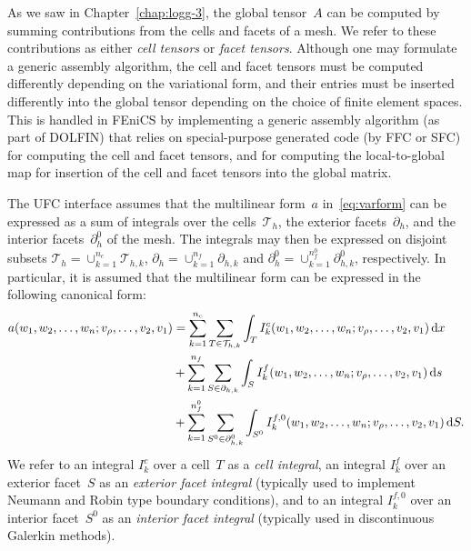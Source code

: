As we saw in Chapter~\ref{chap:logg-3}, the global tensor~$A$ can be
computed by summing contributions from the cells and facets of a
mesh. We refer to these contributions as either \emph{cell tensors} or
\emph{facet tensors}. Although one may formulate a generic assembly
algorithm, the cell and facet tensors must be computed differently
depending on the variational form, and their entries must be inserted
differently into the global tensor depending on the choice of finite
element spaces. This is handled in FEniCS by implementing a generic
assembly algorithm (as part of DOLFIN) that relies on special-purpose
generated code (by FFC or SFC) for computing the cell and facet
tensors, and for computing the local-to-global map for insertion of
the cell and facet tensors into the global matrix.

The UFC interface assumes that the multilinear form~$a$
in~\eqref{eq:varform} can be expressed as a sum of integrals over the
cells~$\mathcal{T}_h$, the exterior facets~$\partial_h$, and the
interior facets~$\partial_h^0$ of the mesh. The integrals may then be
expressed on disjoint subsets $\mathcal{T}_h = \cup_{k=1}^{n_c}
\mathcal{T}_{h,k}$, $\partial_h = \cup_{k=1}^{n_f} \partial_{h,k}$
and $\partial_h^0 = \cup_{k=1}^{n_f^0} \partial_{h,k}^0$,
respectively. In particular, it is assumed that the multilinear form
can be expressed in the following canonical form:
\begin{equation} \label{eq:form_integrals}
  \begin{split}
    a(w_1, w_2, \ldots, w_n; v_{\rho}, \ldots, v_2, v_1)
    &=
    \sum_{k=1}^{n_c} \sum_{T\in\mathcal{T}_{h,k}} \int_{T}
    I^c_k(w_1, w_2, \ldots, w_n; v_{\rho}, \ldots, v_2, v_1) \, \mathrm{d}x \\
    &+
    \sum_{k=1}^{n_f} \sum_{S\in\partial_{h,k}} \int_{S}
    I^f_k(w_1, w_2, \ldots, w_n; v_{\rho}, \ldots, v_2, v_1) \, \mathrm{d}s \\
    &+
    \sum_{k=1}^{n_f^0} \sum_{S^0\in\partial_{h,k}^0} \int_{S^0}
    I^{f,0}_k(w_1, w_2, \ldots, w_n; v_{\rho}, \ldots, v_2, v_1) \, \mathrm{d}S.
  \end{split}
\end{equation}
We refer to an integral $I^c_k$ over a cell~$T$ as a \emph{cell
  integral}, an integral $I^f_k$ over an exterior facet~$S$ as an
\emph{exterior facet integral} (typically used to implement Neumann
and Robin type boundary conditions), and to an integral $I^{f,0}_k$
over an interior facet~$S^0$ as an \emph{interior facet integral}
(typically used in discontinuous Galerkin methods).

